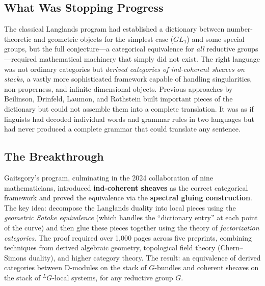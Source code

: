 \subsection{What Was Stopping Progress}
The classical Langlands program had established a dictionary between number-theoretic and geometric objects for the simplest case ($GL_1$) and some special groups, but the full conjecture---a categorical equivalence for \emph{all} reductive groups---required mathematical machinery that simply did not exist. The right language was not ordinary categories but \emph{derived categories of ind-coherent sheaves on stacks}, a vastly more sophisticated framework capable of handling singularities, non-properness, and infinite-dimensional objects. Previous approaches by Beilinson, Drinfeld, Laumon, and Rothstein built important pieces of the dictionary but could not assemble them into a complete translation. It was as if linguists had decoded individual words and grammar rules in two languages but had never produced a complete grammar that could translate any sentence.

\subsection{The Breakthrough}
Gaitsgory's program, culminating in the 2024 collaboration of nine mathematicians, introduced \textbf{ind-coherent sheaves} as the correct categorical framework and proved the equivalence via the \textbf{spectral gluing construction}. The key idea: decompose the Langlands duality into local pieces using the \emph{geometric Satake equivalence} (which handles the ``dictionary entry'' at each point of the curve) and then glue these pieces together using the theory of \emph{factorization categories}. The proof required over 1,000 pages across five preprints, combining techniques from derived algebraic geometry, topological field theory (Chern--Simons duality), and higher category theory. The result: an equivalence of derived categories between D-modules on the stack of $G$-bundles and coherent sheaves on the stack of ${}^L\!G$-local systems, for any reductive group $G$.

